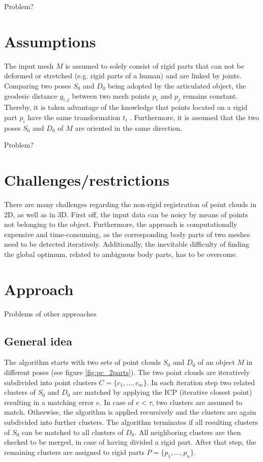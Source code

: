 \documentclass[notitlepage,english]{hgbreport}
\begin{document}
Problem?

\section{Assumptions}

The input mesh $M$ is assumed to solely consist of rigid parts that can not be deformed or stretched (e.g. rigid parts of a human) and are linked by joints. Comparing two poses $S_0$ and $D_0$ being adopted by the articulated object, the geodesic distance $g_{i,j}$ between two mesh points $p_i$ and $p_j$ remains constant. Thereby, it is taken advantage of the knowledge that points located on a rigid part $p_i$ have the same transformation $t_i$ . Furthermore, it is assumed that the two poses $S_0$ and $D_0$ of $M$ are oriented in the same direction.

Problem?

\section{Challenges/restrictions}

There are many challenges regarding the non-rigid registration of point clouds in 2D, as well as in 3D. First off, the input data can be noisy by means of points not belonging to the object. Furthermore, the approach is computationally expensive and time-consuming, as the corresponding body parts of two meshes need to be detected iteratively. Additionally, the inevitable difficulty of finding the global optimum, related to ambiguous body parts, has to be overcome.

\section{Approach}
\label{divideAndConquer}

Problems of other approaches

\subsection{General idea}

The algorithm starts with two sets of point clouds $S_0$ and $D_0$ of an object $M$ in different poses (see figure \ref{fig:pc_2parts}). The two point clouds are iteratively subdivided into point clusters $ C =  \{ {c_1, ... , c_m}\}$. In each iteration step two related clusters of $S_0$ and $D_0$ are matched by applying the ICP (iterative closest point) resulting in a matching error $e$. In case of $ e < \tau $, two clusters are assumed to match. Otherwise, the algorithm is applied recursively and the clusters are again subdivided into further clusters. The algorithm terminates if all resulting clusters of $S_0$ can be matched to all clusters of $D_0$. All neighboring clusters are then checked to be merged, in case of having divided a rigid part. After that step, the remaining clusters are assigned to rigid parts $ P =  \{ {p_1, ..., p_n}\}$.
\end{document}
